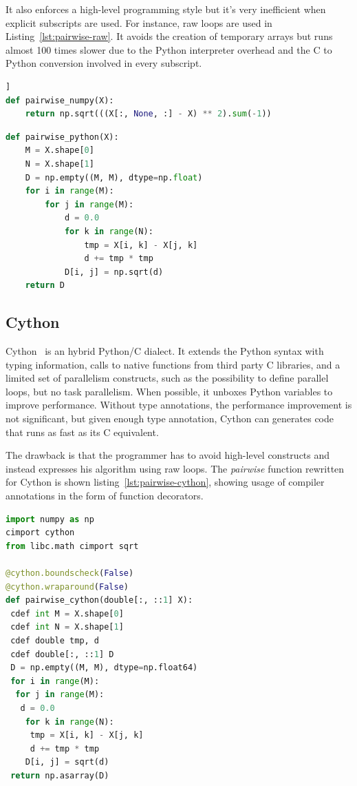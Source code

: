 \documentclass[10pt, preprint]{sigplanconf}
\begin{document}
It also enforces a high-level programming style but it's very inefficient when
explicit subscripts are used.  For instance, raw loops are used in
Listing~\ref{lst:pairwise-raw}. It avoids the creation of temporary arrays but
runs almost 100 times slower due to the Python interpreter overhead and the C
to Python conversion involved in every subscript.

\begin{lstlisting}[language=python, caption={\textit{pairwise} function that
  exhibits array broadcasting.}, label={lst:pairwise}, breaklines=true]]
def pairwise_numpy(X):
    return np.sqrt(((X[:, None, :] - X) ** 2).sum(-1))
\end{lstlisting}


\begin{lstlisting}[language=python, caption={\textit{pairwise} function
  using raw loops.}, label={lst:pairwise-raw}]
def pairwise_python(X):
    M = X.shape[0]
    N = X.shape[1]
    D = np.empty((M, M), dtype=np.float)
    for i in range(M):
        for j in range(M):
            d = 0.0
            for k in range(N):
                tmp = X[i, k] - X[j, k]
                d += tmp * tmp
            D[i, j] = np.sqrt(d)
    return D
\end{lstlisting}

\subsection{Cython}
%
Cython~\cite{cython2010} is an hybrid Python/C dialect. It extends the Python
syntax with typing information, calls to native functions from third party C
libraries, and a limited set of parallelism constructs, such as the possibility
to define parallel loops, but no task parallelism. When possible, it unboxes %
Python variables to improve performance. Without type annotations, the
performance improvement is not significant, but given enough type annotation,
Cython can generates code that runs as fast as its C equivalent.

The drawback is that the programmer has to avoid high-level constructs and
instead expresses his algorithm using raw loops.  The \textit{pairwise}
function rewritten for Cython is shown listing~\ref{lst:pairwise-cython},
showing usage of compiler annotations in the form of function decorators.

\begin{lstlisting}[language=python, caption={\textit{pairwise} function
  rewritten for Cython.}, label={lst:pairwise-cython}]
%%cython
import numpy as np
cimport cython
from libc.math cimport sqrt

@cython.boundscheck(False)
@cython.wraparound(False)
def pairwise_cython(double[:, ::1] X):
 cdef int M = X.shape[0]
 cdef int N = X.shape[1]
 cdef double tmp, d
 cdef double[:, ::1] D
 D = np.empty((M, M), dtype=np.float64)
 for i in range(M):
  for j in range(M):
   d = 0.0
    for k in range(N):
     tmp = X[i, k] - X[j, k]
     d += tmp * tmp
    D[i, j] = sqrt(d)
 return np.asarray(D)
\end{lstlisting}
\end{document}
